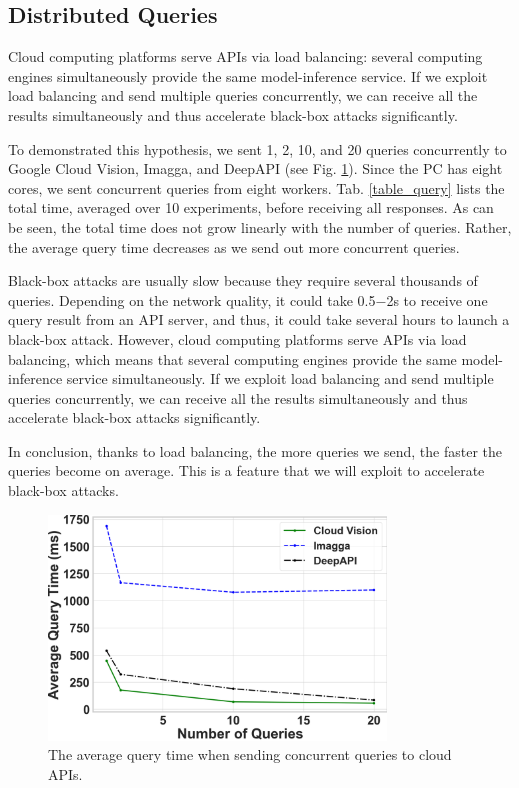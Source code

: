 \subsection{Distributed Queries}

Cloud computing platforms serve APIs via load balancing: several computing engines simultaneously provide the same model-inference service. If we exploit load balancing and send multiple queries concurrently, we can receive all the results simultaneously and thus accelerate black-box attacks significantly.

To demonstrated this hypothesis, we sent 1, 2, 10, and 20 queries concurrently to Google Cloud Vision, Imagga, and DeepAPI (see Fig. \ref{fig:dist_query}). Since the PC has eight cores, we sent concurrent queries from eight workers. Tab. \ref{table_query} lists the total time, averaged over 10 experiments, before receiving all responses. As can be seen, the total time does not grow linearly with the number of queries. Rather, the average query time decreases as we send out more concurrent queries.

Black-box attacks are usually slow because they require several thousands of queries. Depending on the network quality, it could take 0.5$-$2s to receive one query result from an API server, and thus, it could take several hours to launch a black-box attack. However, cloud computing platforms serve APIs via load balancing, which means that several computing engines provide the same model-inference service simultaneously. If we exploit load balancing and send multiple queries concurrently, we can receive all the results simultaneously and thus accelerate black-box attacks significantly. 

In conclusion, thanks to load balancing, the more queries we send, the faster the queries become on average. This is a feature that we will exploit to accelerate black-box attacks. 


\begin{figure}[H]
    \centering
    \includegraphics[width=0.8\textwidth]{figures/chapter_classification/average_query_time.png}
    \caption{The average query time when sending concurrent queries to cloud APIs.}
    \label{fig:dist_query}
\end{figure}

